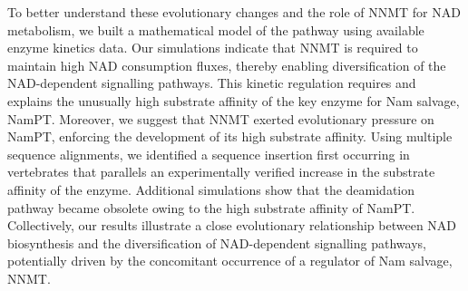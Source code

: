 To better understand these evolutionary changes and the role of NNMT for NAD metabolism, we built a mathematical model of the pathway using available enzyme kinetics data. Our simulations indicate that NNMT is required to maintain high NAD consumption fluxes, thereby enabling diversification of the NAD-dependent signalling pathways. This kinetic regulation requires and explains the unusually high substrate affinity of the key enzyme for Nam salvage, NamPT. Moreover, we suggest that NNMT exerted evolutionary pressure on NamPT, enforcing the development of its high substrate affinity. Using multiple sequence alignments, we identified a sequence insertion first occurring in vertebrates that parallels an experimentally verified increase in the substrate affinity of the enzyme. Additional simulations show that the deamidation pathway became obsolete owing to the high substrate affinity of NamPT. Collectively, our results illustrate a close evolutionary relationship between NAD biosynthesis and the diversification of NAD-dependent signalling pathways, potentially driven by the concomitant occurrence of a regulator of Nam salvage, NNMT.


